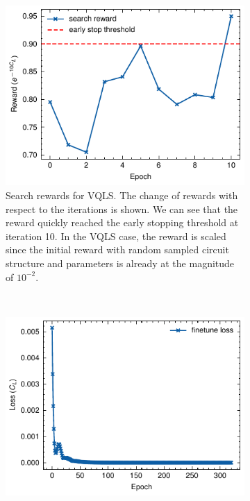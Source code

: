 \documentclass[a4paper,onecolumn,11pt]{quantumarticle}
\begin{document}
\begin{figure}[H]
    \centering
    \begin{subfigure}[t]{0.48\textwidth}
        \includegraphics[width=\textwidth]{Figures/fig_vqls_4q_search_rewards.pdf}
        \caption{Search rewards for VQLS. The change of rewards with respect to the iterations is shown. We can see that the reward quickly reached the early stopping threshold at iteration 10. In the VQLS case, the reward is scaled since the initial reward with random sampled circuit structure and parameters is already at the magnitude of $10^{-2}$.}
        \label{fig:vqls_4q_search}
    \end{subfigure}
    ~ %
    \begin{subfigure}[t]{0.48\textwidth}
        \includegraphics[width=\textwidth]{Figures/fig_vqls_4q_finetune.pdf}

\end{subfigure}
\end{figure}
\end{document}
